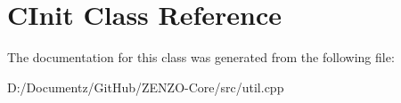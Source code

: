 \hypertarget{class_c_init}{}\section{C\+Init Class Reference}
\label{class_c_init}


The documentation for this class was generated from the following file\+:\begin{DoxyCompactItemize}
\item 
D\+:/\+Documentz/\+Git\+Hub/\+Z\+E\+N\+Z\+O-\/\+Core/src/util.\+cpp\end{DoxyCompactItemize}
